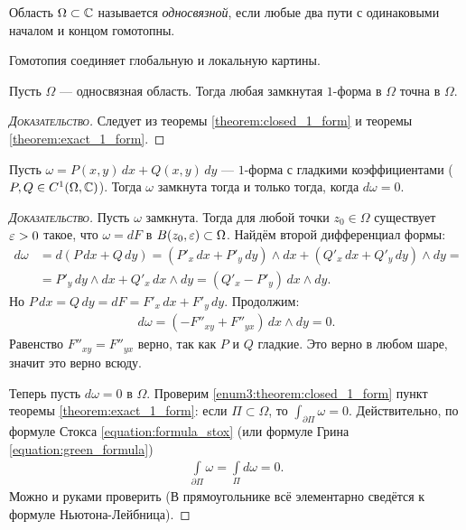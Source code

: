 \documentclass[../../main.tex]{subfiles}
\begin{document}
\begin{df}
 Область $\Omega \subset \mathbb{C}$ называется \textit{односвязной}, если любые два пути с одинаковыми началом и концом гомотопны.
\end{df}

Гомотопия соединяет глобальную и локальную картины.

\begin{crly}
 Пусть $\Omega$ --- односвязная область. Тогда любая замкнутая $1$-форма в $\Omega$ точна в $\Omega$.
\end{crly}
\begin{proof}[\normalfont\textsc{Доказательство}]
 Следует из теоремы \ref{theorem:closed_1_form} и теоремы \ref{theorem:exact_1_form}.
\end{proof}

\begin{thm}
 Пусть $\omega = P(x,y)\,dx + Q(x,y)\,dy$ --- $1$-форма с гладкими коэффициентами ($P, Q \in C^{1}(\Omega, \mathbb{C})$). Тогда $\omega$ замкнута тогда и только тогда, когда $d \omega = 0$.
\end{thm}
\begin{proof}[\normalfont\textsc{Доказательство}]
 Пусть $\omega$ замкнута. Тогда для любой точки $z_0 \in \Omega$  существует $\varepsilon > 0$ такое, что $\omega = dF$ в $B(z_0, \varepsilon) \subset \Omega$. Найдём второй дифференциал формы:
 \begin{align*}
  d \omega &= d(P\,dx + Q\,dy) = (P'_x \, dx + P'_y\,dy) \land dx + (Q'_x \, dx + Q'_y \, dy) \land dy = \\
  &= P'_y \, dy \land dx + Q'_x \, dx \land dy = (Q'_x - P'_y) \, dx \land dy.
 \end{align*} Но $P\,dx = Q \, dy = dF = F'_x \, dx + F'_y \, dy$. Продолжим:
 \begin{align*}
  d \omega = (-F''_{xy} + F''_{yx})\,dx \land dy = 0
 .\end{align*} Равенство $F''_{xy} = F''_{yx}$ верно, так как $P$ и $Q$ гладкие. Это верно в любом шаре, значит это верно всюду.


 Теперь пусть $d \omega = 0$ в $\Omega$. Проверим \ref{enum3:theorem:closed_1_form} пункт теоремы \ref{theorem:exact_1_form}: если $\Pi \subset \Omega$, то $\int_{\partial\Pi} \omega = 0 $. Действительно, по формуле Стокса \eqref{equation:formula_stox} (или формуле Грина \eqref{equation:green_formula})
 \begin{align*}
  \int\limits_{\partial\Pi} \omega = \int\limits_{\Pi} d\omega = 0.  
 \end{align*} Можно и руками проверить (В прямоугольнике всё элементарно сведётся к формуле Ньютона-Лейбница).
\end{proof}
\end{document}
